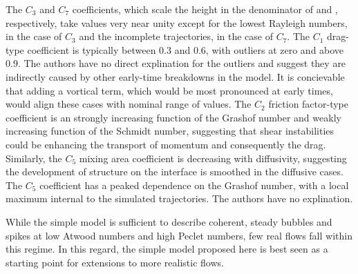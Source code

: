 The $C_3$ and $C_7$ coefficients, which scale the height in the denominator of  and , respectively, take values very near unity except for the lowest Rayleigh numbers, in the case of $C_3$ and the incomplete trajectories, in the case of $C_7$.
The $C_1$ drag-type coefficient is typically between $0.3$ and $0.6$, with outliers at zero and above $0.9$.
The authors have no direct explination for the outliers and suggest they are indirectly caused by other early-time breakdowns in the model.
It is concievable that adding a vortical term, which would be most pronounced at early times, would align these cases with nominal range of values.
The $C_2$ friction factor-type coefficient is an strongly increasing function of the Grashof number and weakly increasing function of the Schmidt number, suggesting that shear instabilities could be enhancing the transport of momentum and consequently the drag.
Similarly, the $C_5$ mixing area coefficient is decreasing with diffusivity, suggesting the development of structure on the interface is smoothed in the diffusive cases.
The $C_5$ coefficient has a peaked dependence on the Grashof number, with a local maximum internal to the simulated trajectories.
The authors have no explination.

While the simple model is sufficient to describe coherent, steady bubbles and spikes at low Atwood numbers and high Peclet numbers, few real flows fall within this regime.
In this regard, the simple model proposed here is best seen as a starting point for extensions to more realistic flows.
